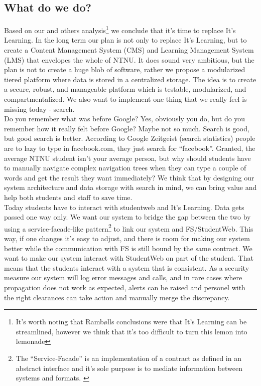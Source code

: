 \subsection{What do we do?}
Based on our and others analysis\footnote{It's worth noting that Rambølls conclusions were that It's Learning can be streamlined, 
however we think that it's too difficult to turn this lemon into lemonade} 
\cite{lmsstrat} we conclude that it's time to replace It's Learning. In the long term our plan is not only to replace It's 
Learning, but to create
a Content Management System (CMS) and Learning Management System (LMS) that envelopes the whole of NTNU. It does sound very ambitious, but the plan is not to create a huge blob of software, rather we propose a modularized tiered  
platform where data is stored in a centralized storage. The idea is to create a secure, robust, and manageable platform which is 
testable, modularized, and compartmentalized.
We also want to implement one thing that we really feel is missing today - search. \\

\noindent
Do you remember what was before Google? Yes, obviously you do, but do you remember how it really felt before Google? Maybe not so much. Search is good, but good search is better. 
According to Google Zeitgeist (search statistics) \cite{google:zeitgeist} people are to lazy to type in facebook.com, they just search for ``facebook''. Granted, the average NTNU 
student isn't your average person, but why should students have to manually navigate complex navigation trees when they can type a couple of words and get the result they want 
immediately? We think that by designing our system architecture and data storage with search in mind, we can bring value and help both students and staff to save time.\\

\noindent
Today students have to interact with studentweb and It's Learning. Data gets passed one way only. We want our system to bridge the gap between the two by using a 
service-facade-like pattern\footnote{The ``Service-Facade'' is an implementation of a contract as defined in an abstract interface and it's sole purpose is to mediate information between systems and formats. \cite{eepatterns}}
to link our system and FS/StudentWeb. This way, if one changes it's easy to adjust, and there is room for making our system better while the communication with FS is still bound by 
the same contract. We want to make our system interact with StudentWeb on part of the student. That means that the students interact with a system that is consistent. As a security 
measure our system will log error messages and calls, and in rare cases where propagation does not work as expected, alerts can be raised and personel with the right clearances can 
take action and manually merge the discrepancy. %
